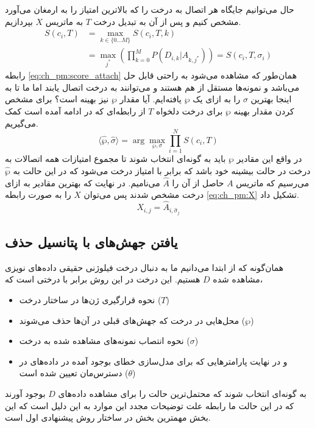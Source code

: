 حال می‌توانیم جایگاه هر اتصال به درخت را که بالاترین امتیاز را به ارمغان می‌آورد مشخص کنیم و پس از آن به تبدیل درخت $T$ به ماتریس $X$ بپردازیم.
\begin{equation}
	\begin{aligned}
		S(c_i, T) &= \max_{k \in \{0 \dots M\}} S(c_i, T, k) \\
		&= \max_{j^*} \left( \prod_{k=0}^{M}P(D_{i,k}|A_{k,j^*})\right) = S(c_i, T, \sigma_i)
	\end{aligned}
	\label{eq:ch_pm:score_attach}
\end{equation}
رابطه \ref{eq:ch_pm:score_attach} همان‌طور که مشاهده می‌شود به راحتی قابل حل می‌باشد و نمونه‌ها مستقل از هم هستند و می‌توانند به درخت اتصال یابند اما ما تا به اینجا بهترین $\sigma$ را به ازای یک $\wp$ یافته‌ایم. آیا مقدار $\wp$ نیز بهینه است؟
برای مشخص کردن مقدار بهینه $\wp$ برای درخت دلخواه $T$ از رابطه‌ای که در ادامه آمده است کمک می‌گیریم.
\begin{equation}
	\langle\hat{\wp}, \hat{\sigma}\rangle = \arg \max_{\wp, \sigma} \prod_{i=1}^{N}S(c_i, T)
	\label{eq:ch_pm:T_score}
\end{equation}
در واقع این مقادیر $\wp$ باید به گونه‌ای انتخاب شوند تا مجموع امتیازات همه اتصالات به درخت در حالت بیشینه خود باشد که برابر با امتیاز درخت می‌شود که در این حالت به $\hat{\wp}$ می‌رسیم که ماتریس $A$ حاصل از آن را $\hat{A}$ می‌نامیم. در نهایت که بهترین مقادیر به ازای درخت مشخص شدند پس می‌توان $X$ را به صورت رابطه \ref{eq:ch_pm:X} تشکیل داد.
\begin{equation}
	X_{i,j} = \hat{A}_{i, \hat{\sigma}_{j}}
	\label{eq:ch_pm:X}
\end{equation}




\subsection{یافتن جهش‌های با پتانسیل حذف}
\label{sec:ch_pm:L}

همان‌گونه که از ابتدا می‌دانیم ما به دنبال درخت فیلوژنی حقیقی داده‌های نویزی مشاهده شده $D$ هستیم. این درخت در این روش برابر با درختی است که،
\begin{itemize}
	\item نحوه قرارگیری ژن‌ها در ساختار درخت ($T$)
	\item محل‌هایی در درخت که جهش‌های قبلی در آن‌ها حذف می‌شوند ($\wp$)
	\item نحوه انتصاب نمونه‌های مشاهده شده به درخت ($\sigma$)
	\item و در نهایت پارامترهایی که برای مدل‌سازی خطای بوجود آمده در داده‌های در دسترس‌مان تعیین شده است ($\theta$)
\end{itemize}
به گونه‌ای انتخاب شوند که محتمل‌ترین حالت را برای مشاهده داده‌های $D$ بوجود آورند که در این حالت ما رابطه 
علت توضیحات مجدد این موارد به این دلیل است که این بخش مهمترین بخش در ساختار روش پیشنهادی اول است. 

